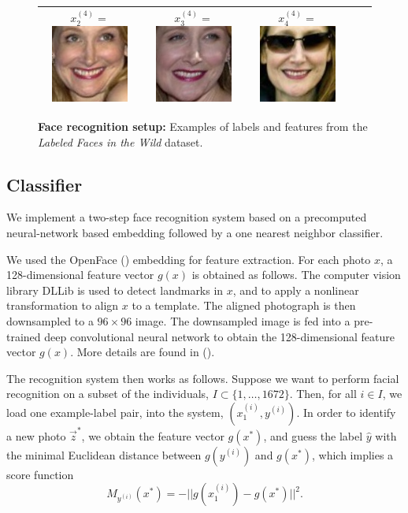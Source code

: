 \documentclass[twoside,11pt]{article}
\begin{document}
\begin{figure}
\begin{tabular}{|c|ccc|c|}
  $x_2^{(4)} = $\includegraphics[scale = 0.2]{face_photos/Patricia_Clarkson_0002.png} &  
  $x_3^{(4)} = $\includegraphics[scale = 0.2]{face_photos/Patricia_Clarkson_0003.png} &  
  $x_4^{(4)} = $\includegraphics[scale = 0.2]{face_photos/Patricia_Clarkson_0004.png} \\ \hline
\end{tabular}
\caption{\textbf{Face recognition setup:} Examples of labels and features from the \emph{Labeled Faces in the Wild} dataset.}
\label{fig:face_rec}
\end{figure}

\subsection{Classifier}
We implement a two-step face recognition system based on a precomputed neural-network based embedding followed by a one nearest neighbor classifier.

We used the OpenFace (\cite{amos2016openface}) embedding for feature
extraction.  For each photo $x$, a 128-dimensional feature vector
$g(x)$ is obtained as follows.  The computer vision library DLLib is
used to detect landmarks in $x$, and to apply a nonlinear
transformation to align $x$ to a template.  The aligned photograph is
then downsampled to a $96 \times 96$ image. The downsampled image is
fed into a pre-trained deep convolutional neural network to obtain the
128-dimensional feature vector $g(x)$. More details are found in
(\cite{amos2016openface}).

The recognition system then works as follows.  Suppose we want to
perform facial recognition on a subset of the individuals, $I \subset
\{1,\hdots, 1672\}$.  Then, for all $i \in I$, we load one example-label pair, into the system, $(x_1^{(i)}, y^{(i)})$.  In
order to identify a new photo $\vec{z}^*$, we obtain the feature
vector $g(x^*)$, and guess the label $\hat{y}$
with the minimal Euclidean distance between $g(y^{(i)})$ and $g(x^*)$,
which implies a score function
\[
M_{y^{(i)}}(x^*) = -||g(x_1^{(i)}) - g(x^*)||^2.
\]
\end{document}
